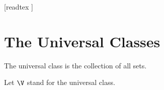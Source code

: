 \documentclass[10pt]{article}
\begin{document}
  \begin{imports}
    \begin{forthel}
      [readtex ]
    \end{forthel}
  \end{imports}


  \section*{The Universal Classes}

  \begin{forthel}
    \begin{definition}
      The universal class is the collection of all sets.
    \end{definition}

    Let $\V$ stand for the universal class.
  \end{forthel}
\end{document}
